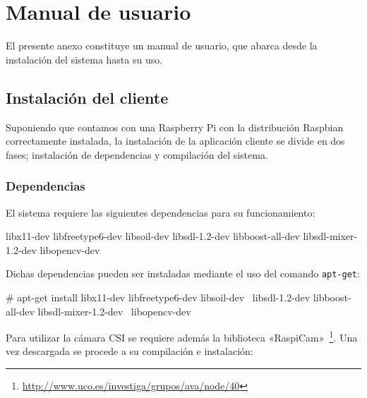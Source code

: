 \chapter{Manual de usuario}
\label{chap:anexo_manual}

El presente anexo constituye un manual de usuario, que abarca desde la instalación del sistema hasta
su uso.

\section{Instalación del cliente}

Suponiendo que contamos con una Raspberry Pi con la distribución Raspbian correctamente instalada,
la instalación de la aplicación cliente se divide en dos fases; instalación de dependencias y
compilación del sistema.

\subsection{Dependencias}

El sistema requiere las siguientes dependencias para su funcionamiento:

\vspace{-0.1cm}

\begin{listing}[%
  style    = consola]
libx11-dev
libfreetype6-dev
libsoil-dev
libsdl-1.2-dev
libboost-all-dev
libsdl-mixer-1.2-dev
libopencv-dev
\end{listing}

\vspace{-0.1cm}

Dichas dependencias pueden ser instaladas mediante el uso del comando \texttt{apt-get}:

\vspace{-0.1cm}

\begin{listing}[%
  style=consola]
# apt-get install libx11-dev libfreetype6-dev libsoil-dev \
    libsdl-1.2-dev libboost-all-dev libsdl-mixer-1.2-dev \
    libopencv-dev
\end{listing}

\vspace{-0.1cm}

Para utilizar la cámara CSI se requiere además la biblioteca
«RaspiCam»~\footnote{\url{http://www.uco.es/investiga/grupos/ava/node/40}}. Una vez descargada se procede
a su compilación e instalación:

\vspace{-0.1cm}

